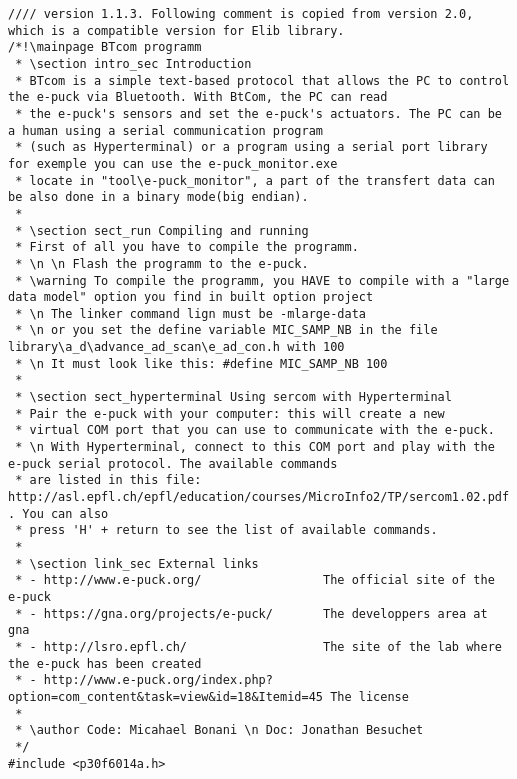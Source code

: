 \begin{lstlisting}
//// version 1.1.3. Following comment is copied from version 2.0, which is a compatible version for Elib library.
/*!\mainpage BTcom programm
 * \section intro_sec Introduction
 * BTcom is a simple text-based protocol that allows the PC to control the e-puck via Bluetooth. With BtCom, the PC can read
 * the e-puck's sensors and set the e-puck's actuators. The PC can be a human using a serial communication program
 * (such as Hyperterminal) or a program using a serial port library for exemple you can use the e-puck_monitor.exe
 * locate in "tool\e-puck_monitor", a part of the transfert data can be also done in a binary mode(big endian).
 *
 * \section sect_run Compiling and running
 * First of all you have to compile the programm.
 * \n \n Flash the programm to the e-puck.
 * \warning To compile the programm, you HAVE to compile with a "large data model" option you find in built option project 
 * \n The linker command lign must be -mlarge-data 
 * \n or you set the define variable MIC_SAMP_NB in the file library\a_d\advance_ad_scan\e_ad_con.h with 100
 * \n It must look like this: #define MIC_SAMP_NB 100
 * 
 * \section sect_hyperterminal Using sercom with Hyperterminal
 * Pair the e-puck with your computer: this will create a new
 * virtual COM port that you can use to communicate with the e-puck.
 * \n With Hyperterminal, connect to this COM port and play with the e-puck serial protocol. The available commands
 * are listed in this file: http://asl.epfl.ch/epfl/education/courses/MicroInfo2/TP/sercom1.02.pdf . You can also
 * press 'H' + return to see the list of available commands.
 * 
 * \section link_sec External links
 * - http://www.e-puck.org/                 The official site of the e-puck
 * - https://gna.org/projects/e-puck/       The developpers area at gna
 * - http://lsro.epfl.ch/                   The site of the lab where the e-puck has been created
 * - http://www.e-puck.org/index.php?option=com_content&task=view&id=18&Itemid=45 The license
 *
 * \author Code: Micahael Bonani \n Doc: Jonathan Besuchet
 */
#include <p30f6014a.h>


\end{lstlisting}
